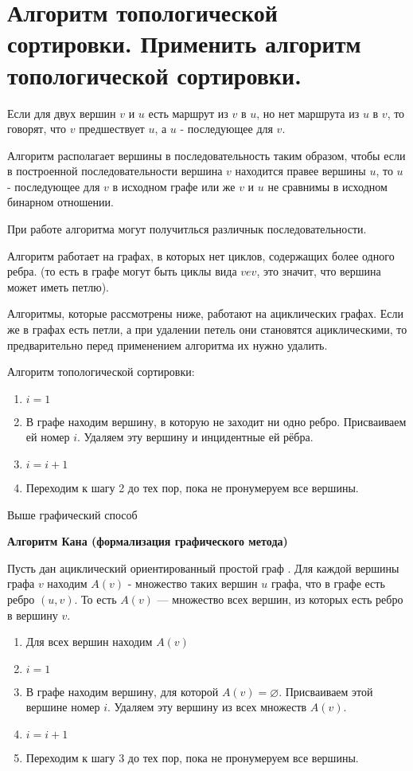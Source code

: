 \section{Алгоритм топологической сортировки. Применить алгоритм топологической сортировки.}

Если для двух вершин $v$ и $u$ есть маршрут из $v$ в $u$, но нет маршрута из $u$ в $v$,
то говорят, что $v$ предшествует $u$, а $u$ - последующее для $v$.

Алгоритм располагает вершины в последовательность таким образом, чтобы
если в построенной последовательности вершина $v$ находится правее
вершины $u$, то $u$ - последующее для $v$ в исходном графе или же $v$ и $u$ не
сравнимы в исходном бинарном отношении.

При работе алгоритма могут получитлься различнык последовательности.

Алгоритм работает на графах, в которых нет циклов,
содержащих более одного ребра. (то есть в графе могут быть циклы вида $vev$,
это значит, что вершина может иметь петлю).

Алгоритмы, которые рассмотрены ниже, работают на
ациклических графах. Если же в графах есть петли, а при удалении петель они
становятся ациклическими, то предварительно перед применением алгоритма
их нужно удалить.

Алгоритм топологической сортировки:
\begin{enumerate}[left=0.0em, labelsep=1em, topsep=0.0em, itemsep=0pt, parsep=0.5em]
    \item $i=1$
    \item В графе находим вершину, в которую не заходит ни одно ребро.
    Присваиваем ей номер $i$. Удаляем эту вершину и инцидентные ей рёбра.
    \item $i=i+1$
    \item Переходим к шагу 2 до тех пор, пока не пронумеруем все вершины.
\end{enumerate}

Выше графический способ

\newpage
\textbf{Алгоритм Кана (формализация графического метода)}

Пусть дан ациклический ориентированный простой граф . Для каждой
вершины графа $v$ находим $A(v)$ - множество таких вершин $u$ графа, что в
графе есть ребро $(u,v)$. То есть $A(v)$ — множество всех вершин, из которых
есть ребро в вершину $v$.

\begin{enumerate}[left=0.0em, labelsep=1em, topsep=0.0em, itemsep=0pt, parsep=0.5em]
    \item Для всех вершин находим $A(v)$
    \item $i=1$
    \item В графе находим вершину, для которой $A(v) = \varnothing$. Присваиваем этой
    вершине номер $i$. Удаляем эту вершину из всех множеств $A(v)$.
    \item $i=i+1$
    \item Переходим к шагу 3 до тех пор, пока не пронумеруем все вершины.
\end{enumerate}

